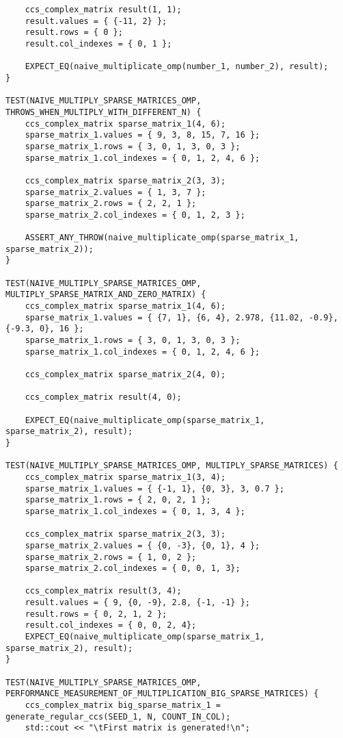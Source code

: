 \documentclass{report}
\begin{document}
\begin{lstlisting}
    ccs_complex_matrix result(1, 1);
    result.values = { {-11, 2} };
    result.rows = { 0 };
    result.col_indexes = { 0, 1 };

    EXPECT_EQ(naive_multiplicate_omp(number_1, number_2), result);
}

TEST(NAIVE_MULTIPLY_SPARSE_MATRICES_OMP, THROWS_WHEN_MULTIPLY_WITH_DIFFERENT_N) {
    ccs_complex_matrix sparse_matrix_1(4, 6);
    sparse_matrix_1.values = { 9, 3, 8, 15, 7, 16 };
    sparse_matrix_1.rows = { 3, 0, 1, 3, 0, 3 };
    sparse_matrix_1.col_indexes = { 0, 1, 2, 4, 6 };

    ccs_complex_matrix sparse_matrix_2(3, 3);
    sparse_matrix_2.values = { 1, 3, 7 };
    sparse_matrix_2.rows = { 2, 2, 1 };
    sparse_matrix_2.col_indexes = { 0, 1, 2, 3 };

    ASSERT_ANY_THROW(naive_multiplicate_omp(sparse_matrix_1, sparse_matrix_2));
}

TEST(NAIVE_MULTIPLY_SPARSE_MATRICES_OMP, MULTIPLY_SPARSE_MATRIX_AND_ZERO_MATRIX) {
    ccs_complex_matrix sparse_matrix_1(4, 6);
    sparse_matrix_1.values = { {7, 1}, {6, 4}, 2.978, {11.02, -0.9}, {-9.3, 0}, 16 };
    sparse_matrix_1.rows = { 3, 0, 1, 3, 0, 3 };
    sparse_matrix_1.col_indexes = { 0, 1, 2, 4, 6 };

    ccs_complex_matrix sparse_matrix_2(4, 0);

    ccs_complex_matrix result(4, 0);

    EXPECT_EQ(naive_multiplicate_omp(sparse_matrix_1, sparse_matrix_2), result);
}

TEST(NAIVE_MULTIPLY_SPARSE_MATRICES_OMP, MULTIPLY_SPARSE_MATRICES) {
    ccs_complex_matrix sparse_matrix_1(3, 4);
    sparse_matrix_1.values = { {-1, 1}, {0, 3}, 3, 0.7 };
    sparse_matrix_1.rows = { 2, 0, 2, 1 };
    sparse_matrix_1.col_indexes = { 0, 1, 3, 4 };

    ccs_complex_matrix sparse_matrix_2(3, 3);
    sparse_matrix_2.values = { {0, -3}, {0, 1}, 4 };
    sparse_matrix_2.rows = { 1, 0, 2 };
    sparse_matrix_2.col_indexes = { 0, 0, 1, 3};

    ccs_complex_matrix result(3, 4);
    result.values = { 9, {0, -9}, 2.8, {-1, -1} };
    result.rows = { 0, 2, 1, 2 };
    result.col_indexes = { 0, 0, 2, 4};
    EXPECT_EQ(naive_multiplicate_omp(sparse_matrix_1, sparse_matrix_2), result);
}

TEST(NAIVE_MULTIPLY_SPARSE_MATRICES_OMP, PERFORMANCE_MEASUREMENT_OF_MULTIPLICATION_BIG_SPARSE_MATRICES) {
    ccs_complex_matrix big_sparse_matrix_1 = generate_regular_ccs(SEED_1, N, COUNT_IN_COL);
    std::cout << "\tFirst matrix is generated!\n";


\end{lstlisting}
\end{document}
